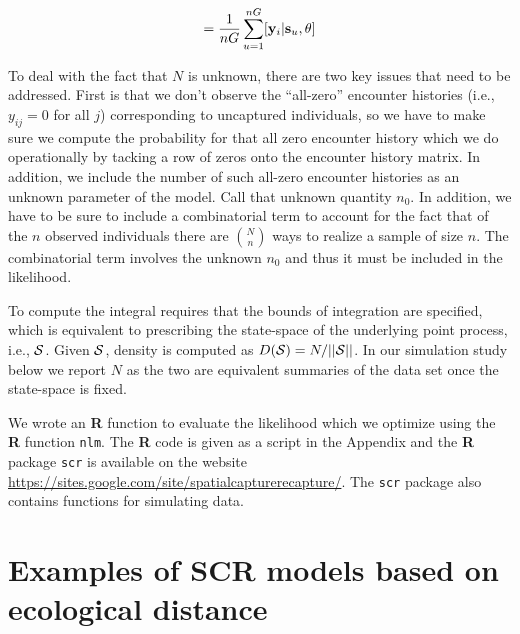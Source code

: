\documentclass[12pt]{article}
\begin{document}
\begin{equation}
         [{\bf y}_{i}|\theta] = \frac{1}{nG} \sum_{u=1}^{nG}  [ {\bf
            y}_{i} |{\bf s}_u, \theta]
\label{mle.eq.intlik}
\end{equation}

To deal with the fact that $N$ is unknown,
there are two key issues that need to be addressed.
First is that
we don't observe the ``all-zero'' encounter histories (i.e., $y_{ij} = 0$ for all $j$)
corresponding to 
uncaptured individuals, so we have to
make sure we compute the probability for that all zero encounter history which
we do operationally by tacking a row of zeros onto the encounter history matrix. In
addition, we include the number of such all-zero encounter histories
as an unknown parameter of the model. Call that unknown quantity $n_{0}$.
In addition, we have to be sure to include a combinatorial term to
account for the fact that of the $n$ observed individuals there are
${N \choose n}$
 ways to realize a sample of size $n$. The combinatorial term
involves the unknown $n_{0}$ and thus it must be included in the likelihood.

To compute the integral requires that the bounds of integration are
specified, which is equivalent to prescribing the state-space of the
underlying point process, i.e., ${\cal S}$. Given ${\cal S}$, density
is 
computed as $D({\cal S}) = N/||{\cal S}||$. In our simulation study
below we report $N$ as the two are equivalent summaries of the data
set once the state-space is fixed.

We wrote an {\bf R} function to evaluate the likelihood which we optimize
using the {\bf R} function \mbox{\tt nlm}.
The {\bf R} code is given as a script in the Appendix and the {\bf R}
package \mbox{\tt scr}
is available on the website
\url{https://sites.google.com/site/spatialcapturerecapture/}. The
\mbox{\tt scr} package also contains
functions for simulating data.


\section{Examples of SCR models based on ecological distance}
\end{document}
